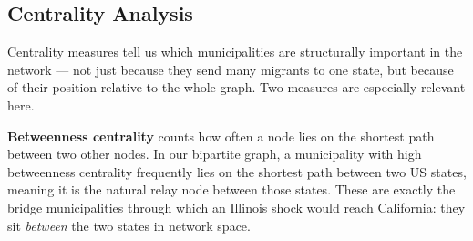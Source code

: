 \documentclass[
  11pt,
  letterpaper,
  DIV=11,
  numbers=noendperiod]{scrartcl}
\newenvironment{Shaded}{}{}
\newcommand{\AttributeTok}[1]{\textcolor[rgb]{0.84,0.23,0.29}{#1}}
\newcommand{\FloatTok}[1]{\textcolor[rgb]{0.00,0.36,0.77}{#1}}
\newcommand{\FunctionTok}[1]{\textcolor[rgb]{0.44,0.26,0.76}{#1}}
\newcommand{\NormalTok}[1]{\textcolor[rgb]{0.14,0.16,0.18}{#1}}
\newcommand{\SpecialCharTok}[1]{\textcolor[rgb]{0.00,0.36,0.77}{#1}}
\newcommand{\StringTok}[1]{\textcolor[rgb]{0.01,0.18,0.38}{#1}}
\begin{document}
\begin{Shaded}
\end{Shaded}

\subsection{Centrality Analysis}\label{centrality-analysis}

Centrality measures tell us which municipalities are structurally
important in the network --- not just because they send many migrants to
one state, but because of their position relative to the whole graph.
Two measures are especially relevant here.

\textbf{Betweenness centrality} counts how often a node lies on the
shortest path between two other nodes. In our bipartite graph, a
municipality with high betweenness centrality frequently lies on the
shortest path between two US states, meaning it is the natural relay
node between those states. These are exactly the bridge municipalities
through which an Illinois shock would reach California: they sit
\emph{between} the two states in network space.
\end{document}
